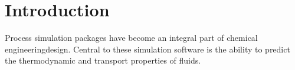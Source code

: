 \documentclass[12pt]{UoAthesis}
\begin{document}






\chapter{Introduction}

Process simulation packages have become an integral part of chemical engineeringdesign. Central to these simulation software is the ability to predict the
thermodynamic and transport properties of fluids.
\end{document}
